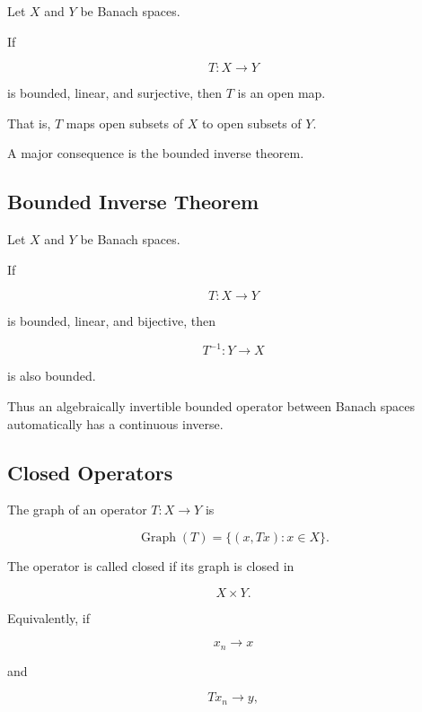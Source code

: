 \begin{theorem}
Let \(X\) and \(Y\) be Banach spaces.

If

\[
T:X\to Y
\]

is bounded, linear, and surjective, then \(T\) is an open map.
\end{theorem}

That is, \(T\) maps open subsets of \(X\) to open subsets of \(Y\).

A major consequence is the bounded inverse theorem.

\subsection{Bounded Inverse Theorem}
\label{subsec:bounded-inverse-theorem}

\begin{theorem}
Let \(X\) and \(Y\) be Banach spaces.

If

\[
T:X\to Y
\]

is bounded, linear, and bijective, then

\[
\boxed{
T^{-1}:Y\to X
}
\]

is also bounded.
\end{theorem}

Thus an algebraically invertible bounded operator between Banach spaces
automatically has a continuous inverse.

\subsection{Closed Operators}
\label{subsec:closed-operators}

The graph of an operator \(T:X\to Y\) is

\[
\boxed{
\operatorname{Graph}(T)
=
\{(x,Tx):x\in X\}.
}
\]

The operator is called closed if its graph is closed in

\[
X\times Y.
\]

Equivalently, if

\[
x_n\to x
\]

and

\[
Tx_n\to y,
\]

